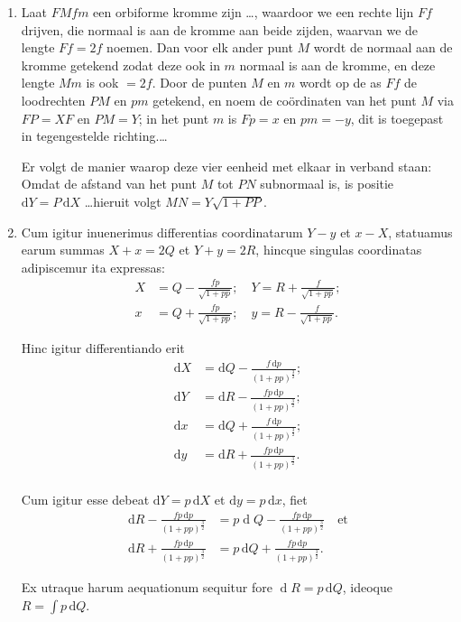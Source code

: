 \documentclass[10pt,a4paper]{article}
\newcommand{\switchenum}{\setcounter{enumi}{\arabic{enumi}-1}\switchcolumn}
\def\D{\mathrm{d}}
\begin{document}
\begin{paracol}{2}
\begin{enumerate}[topsep=1px]
		\switchenum
		\item Laat $FMfm$ een orbiforme kromme zijn \ldots , waardoor we een rechte lijn $Ff$ drijven, die normaal is aan de kromme aan beide zijden, waarvan we de lengte $Ff=2f$ noemen. Dan voor elk ander punt $M$ wordt de normaal aan de kromme getekend zodat deze ook in $m$ normaal is aan de kromme, en deze lengte $Mm$ is ook $=2f$. Door de punten $M$ en $m$ wordt op de as $Ff$ de loodrechten $PM$ en $pm$ getekend, en noem de coördinaten van het punt $M$ via $FP=XF$ en $PM=Y$; in het punt $m$ is $Fp=x$ en $pm=-y$, dit is toegepast in tegengestelde richting.\ldots
		\par Er volgt de manier waarop deze vier eenheid met elkaar in verband staan: Omdat de afstand van het punt $M$ tot $PN$ subnormaal is, is positie $\D Y = P \,\D X$ \ldots hieruit volgt $MN = Y\sqrt{1+PP}$. 
		
		
		\switchcolumn*
		
		\item Cum igitur inuenerimus differentias coordinatarum $Y-y$ et $x-X$, statuamus earum summas $X+x= 2Q$ et $Y+y=2R$, hincque singulas coordinatas adipiscemur ita expressas:
		\begin{align*}
			X &= Q - \frac{fp}{\sqrt{1+pp}}; \quad Y = R + \frac{f}{\sqrt{1+pp}};\\
			x &= Q+\frac{fp}{\sqrt{1+pp}}; \quad y= R- \frac{f}{\sqrt{1+pp}}.
		\end{align*}
		\par Hinc igitur differentiando erit
		\begin{align*}
			\D X &= \D Q - \frac{f\,\D p}{(1+pp)^\frac{3}{2}};\\
			\D Y &= \D R-\frac{fp\,\D p}{(1+pp)^\frac{3}{2}};\\
			\D x &= \D Q + \frac{f\,\D p}{(1+pp)^\frac{3}{2}};\\
			\D y &= \D R + \frac{fp\,\D p}{(1+pp)^\frac{3}{2}}.\\
		\end{align*}
		\par Cum igitur esse debeat $\D Y=p\,\D X$ et $\D y=p\,\D x$, fiet
		\begin{align*}
			\D R - \frac{fp\,\D p}{(1+pp)^\frac{3}{2}} &= p\operatorname{d}Q - \frac{fp\, \D p}{(1+pp)^\frac{3}{2}} \quad \text{et}\\
			\D R + \frac{fp\,\D p}{(1+pp)^\frac{3}{2}} &= p\,\D Q + \frac{fp\,\D p}{(1+pp)^\frac{3}{2}}.
	 	\end{align*}
	 	
		\par Ex utraque harum aequationum sequitur fore $\operatorname{d} R = p\,\D  Q$, ideoque $R = \int p \,\D Q$.
		

\end{enumerate}
\end{paracol}
\end{document}
